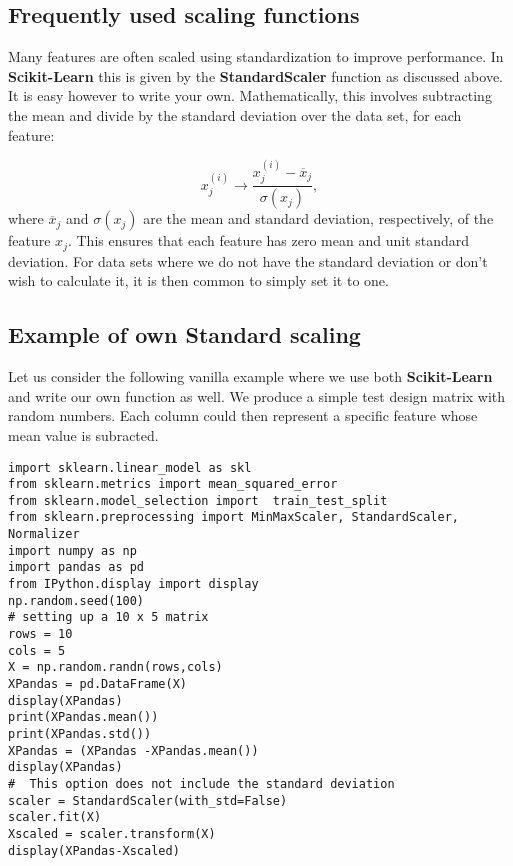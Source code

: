 \documentclass[%
oneside,                 %
final,                   %
10pt]{article}
\begin{document}
\subsection*{Frequently used scaling functions}

Many features are often scaled using standardization to improve performance. In \textbf{Scikit-Learn} this is given by the \textbf{StandardScaler} function as discussed above. It is easy however to write your own. 
Mathematically, this involves subtracting the mean and divide by the standard deviation over the data set, for each feature:

\[
    x_j^{(i)} \rightarrow \frac{x_j^{(i)} - \overline{x}_j}{\sigma(x_j)},
\]
where $\overline{x}_j$ and $\sigma(x_j)$ are the mean and standard deviation, respectively,  of the feature $x_j$.
This ensures that each feature has zero mean and unit standard deviation.  For data sets where  we do not have the standard deviation or don't wish to calculate it,  it is then common to simply set it to one.

\subsection*{Example of own Standard scaling}

Let us consider the following vanilla example where we use both
\textbf{Scikit-Learn} and write our own function as well.  We produce a
simple test design matrix with random numbers. Each column could then
represent a specific feature whose mean value is subracted.

























\begin{verbatim}
import sklearn.linear_model as skl
from sklearn.metrics import mean_squared_error
from sklearn.model_selection import  train_test_split
from sklearn.preprocessing import MinMaxScaler, StandardScaler, Normalizer
import numpy as np
import pandas as pd
from IPython.display import display
np.random.seed(100)
# setting up a 10 x 5 matrix
rows = 10
cols = 5
X = np.random.randn(rows,cols)
XPandas = pd.DataFrame(X)
display(XPandas)
print(XPandas.mean())
print(XPandas.std())
XPandas = (XPandas -XPandas.mean())
display(XPandas)
#  This option does not include the standard deviation
scaler = StandardScaler(with_std=False)
scaler.fit(X)
Xscaled = scaler.transform(X)
display(XPandas-Xscaled)

\end{verbatim}
\end{document}
